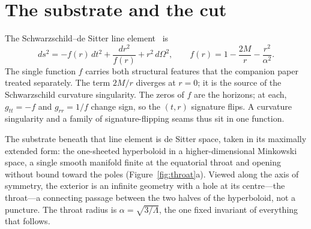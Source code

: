 \documentclass[11pt,a4paper]{article}
\theoremstyle{definition}
\begin{document}
\section{The substrate and the cut}\label{sec:slicing}

The Schwarzschild--de Sitter line element~\cite{Kottler1918} is
\begin{equation}\label{eq:sds}
  ds^{2}=-f(r)\,dt^{2}+\frac{dr^{2}}{f(r)}+r^{2}\,d\Omega^{2},
  \qquad
  f(r)=1-\frac{2M}{r}-\frac{r^{2}}{\alpha^{2}}.
\end{equation}
The single function $f$ carries both structural features that the companion paper treated separately. The term $2M/r$ diverges at $r=0$; it is the source of the Schwarzschild curvature singularity. The zeros of $f$ are the horizons; at each, $g_{tt}=-f$ and $g_{rr}=1/f$ change sign, so the $(t,r)$ signature flips. A curvature singularity and a family of signature-flipping seams thus sit in one function.

The substrate beneath that line element is de Sitter space, taken in its maximally extended form: the one-sheeted hyperboloid in a higher-dimensional Minkowski space, a single smooth manifold finite at the equatorial throat and opening without bound toward the poles (Figure~\ref{fig:throat}a). Viewed along the axis of symmetry, the exterior is an infinite geometry with a hole at its centre---the throat---a connecting passage between the two halves of the hyperboloid, not a puncture. The throat radius is $\alpha=\sqrt{3/\Lambda}$, the one fixed invariant of everything that follows.
\end{document}
